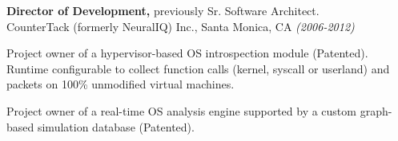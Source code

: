 \documentclass[margin]{res}
\begin{document}
\begin{resume}
{\bf Director of Development,} previously Sr. Software Architect. \\
CounterTack (formerly NeuralIQ) Inc., Santa Monica, CA {\em (2006-2012)}
\begin{list}{}{\leftmargin=1.5em \topsep=5pt \partopsep=0pt \parsep=2.5pt}
  \item Project owner of a hypervisor-based OS introspection module
    (Patented). Runtime configurable to collect function
    calls (kernel, syscall or userland) and packets on 100\%
    unmodified virtual machines.
  \item Project owner of a real-time OS analysis engine supported by a
    custom graph-based simulation database (Patented).
\end{list}




\end{resume}
\end{document}
